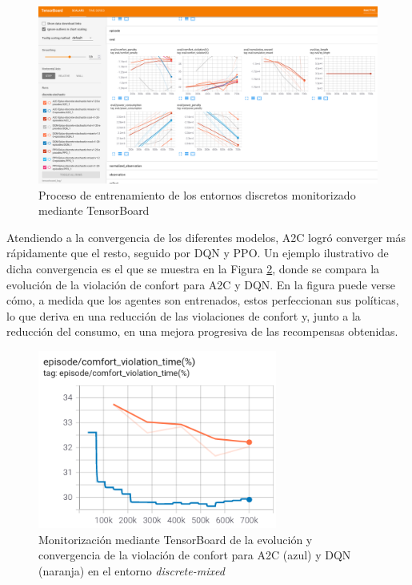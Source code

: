 \begin{figure}
    \centering
    \includegraphics[width=\textwidth]{imagenes/entrenamiento-discretos.png}
    \caption{Proceso de entrenamiento de los entornos discretos monitorizado mediante TensorBoard}
    \label{fig:train-disc}
\end{figure}

Atendiendo a la convergencia de los diferentes modelos, A2C logró converger más rápidamente que el resto, seguido por DQN y PPO. Un ejemplo ilustrativo de dicha convergencia es el que se muestra en la Figura \ref{fig:train-disc-confort}, donde se compara la evolución de la violación de confort para A2C y DQN. En la figura puede verse cómo, a medida que los agentes son entrenados, estos perfeccionan sus políticas, lo que deriva en una reducción de las violaciones de confort y, junto a la reducción del consumo, en una mejora progresiva de las recompensas obtenidas.

\begin{figure}
    \centering
    \includegraphics[width=0.7\textwidth]{imagenes/train-disc-violacion-confort.png}
    \caption{Monitorización mediante TensorBoard de la evolución y convergencia de la violación de confort para A2C (azul) y DQN (naranja) en el entorno \textit{discrete-mixed}}
    \label{fig:train-disc-confort}
\end{figure}


